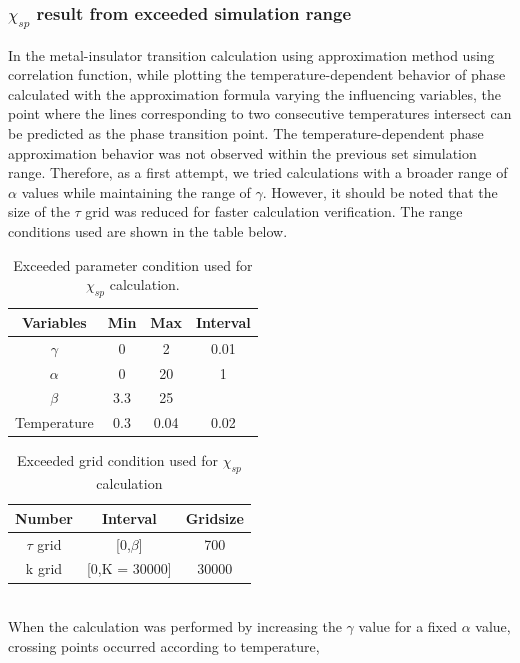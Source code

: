 \documentclass{article}[12pt]
\begin{document}
\begin{spacing}{1.5}
\subsubsection*{$\chi_{sp}$ result from exceeded simulation range}
In the metal-insulator transition calculation using approximation method using correlation function, 
while plotting the temperature-dependent behavior of phase calculated with the approximation formula varying the influencing variables, 
the point where the lines corresponding to two consecutive temperatures intersect can be predicted as the phase transition point.
The temperature-dependent phase approximation behavior was not observed within the previous set simulation range. 
Therefore, as a first attempt, we tried calculations with a broader range of $\alpha$ values while maintaining the range of $\gamma$. 
However, it should be noted that the size of the $\tau$ grid was reduced for faster calculation verification. 
The range conditions used are shown in the table below.
\begin{table}[htbp]
  \centering
  \renewcommand{\arraystretch}{1.2}  %
  \begin{tabular}{@{}cccc@{}}
  \toprule
  \textbf{Variables} & \textbf{Min} & \textbf{Max}  & \textbf{Interval}\\ 
  \midrule
  $\gamma$ & 0 & 2 & 0.01 \\
  $\alpha$ & 0 & 20 & 1 \\
  $\beta$ & 3.3 & 25 &  \\
  Temperature & 0.3 & 0.04 & 0.02 \\
  \bottomrule
  \end{tabular}
  \caption{Exceeded parameter condition used for $\chi_{sp}$ calculation.}
  \end{table}
\begin{table}[htbp]
  \centering
  \renewcommand{\arraystretch}{1.2}  %
  \begin{tabular}{@{}ccc@{}}
  \toprule
  \textbf{Number} & \textbf{Interval} & \textbf{Gridsize}\\ 
  \midrule
  $\tau$ grid & [0,$\beta$] & 700 \\
  k grid & [0,K = 30000] & 30000 \\
  \bottomrule
  \end{tabular}
  \caption{Exceeded grid condition used for $\chi_{sp}$ calculation}
  \end{table}
\\
When the calculation was performed by increasing the $\gamma$ value for a fixed $\alpha$ value, crossing points occurred according to temperature, 

\end{spacing}
\end{document}
